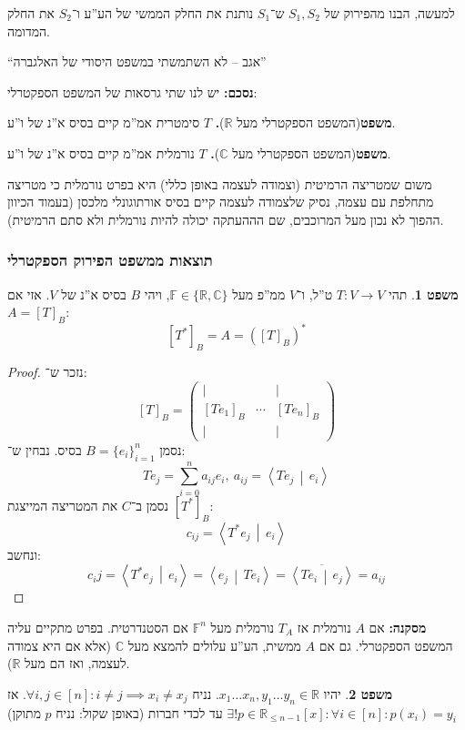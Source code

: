 \documentclass[a4paper]{article}
\newcommand\R     {\mathbb{R}}
\newcommand\C     {\mathbb{C}}
\newcommand\ra    {\rangle}
\newcommand\la    {\langle}
\newcommand\ol    {\overline}
\newcommand\sumni     {\sum_{i = 0}^{n}}
\newcommand\F         {\mathbb{F}}
\newcommand\co        {\colon}
\newcommand\pms[1]    {\begin{pmatrix}
		#1
\end{pmatrix}}
\newcommand\mut [2]   {\left \la #1 \,\middle|\, #2 \right \ra}
\theoremstyle{definition}
\newtheorem{Theorem}{\color{myblue}משפט}
\newcommand\theo  [1] {\begin{Theorem}#1\end{Theorem}}
\begin{document}
	למעשה, הבנו מהפירוק של $S_1, S_2$ ש־$S_1$ נותנת את החלק הממשי של הע''ע ו־$S_2$ את החלק המדומה. 
	
	``אגב – לא השתמשתי במשפט היסודי של האלגברה''
	
	\textbf{נסכם: }יש לנו שתי גרסאות של המשפט הספקטרלי: 
	
	\textbf{משפט}(המשפט הספקטרלי מעל $\R$)\textbf{. }{$T$ סימטרית אמ''מ קיים בסיס א''נ של ו''ע. }
	
	\textbf{משפט}{(המשפט הספקטרלי מעל $\C$)\textbf{. } $T$ נורמלית אמ''מ קיים בסיס א''נ של ו''ע. }
	
	משום שמטריצה הרמיטית (וצמודה לעצמה באופן כללי) היא בפרט נורמלית כי מטריצה מתחלפת עם עצמה, נסיק שלצמודה לעצמה קיים בסיס אורתוגונלי מלכסן (בעמוד הכיוון ההפוך לא נכון מעל המרוכבים, שם הההעתקה יכולה להיות נורמלית ולא סתם הרמיטית). 
	
	\subsubsection{תוצאות ממשפט הפירוק הספקטרלי}
	
	\theo{תהי $T \co V \to V$ ט''ל, ו־$V$ ממ''פ מעל $\F \in \{\R, \C\}$, ויהי $B$ בסיס א''נ של $V$. אזי אם $A = [T]_B$: 
		\[ [T^*]_B = A = ([T]_B)^* \]}  
	\begin{proof}
		נזכר ש־: 
		\[ [T]_B = \pms{\vert &  & \vert \\ [Te_1]_B & \cdots & [Te_n]_B \\ \vert &  & \vert} \]
		נסמן $B = \{e_i\}_{i = 1}^{n}$ בסיס. נבחין ש־: 
		\[ Te_j = \sumni a_{ij}e_i, \ a_{ij} = \mut{Te_j}{e_i} \]
		נסמן ב־$C$ את המטריצה המייצגת $[T^*]_B$: 
		\[ c_{ij} = \mut{T^*e_j}{e_i} \]
		ונחשב: 
		\[ c_ij = \mut{T^*e_j}{e_i} = \mut{e_j}{Te_i} = \ol{\mut{Te_i}{e_j}} = a_{ij} \]
		
	\end{proof}
	
	\textbf{מסקנה: }אם $A$ נורמלית אז $T_A$ נורמלית מעל $\F^n$ אם הסטנדרטית. בפרט מתקיים עליה המשפט הספקטרלי. גם אם $A$ ממשית, הע''ע עלולים להמצא מעל $\C$ (אלא אם היא צמודה לעצמה, ואז הם מעל $\R$). 
	
	\theo{יהיו $x_1 \dots x_n, y_1 \dots y_n \in \R$. נניח $\forall i, j \in [n] \co i \neq j \implies x_i \neq x_j$. אז $\exists! p \in \R_{\le n - 1}[x] \co \forall i \in [n] \co p(x_i) = y_i$ עד לכדי חברות (באופן שקול: נניח $p$ מתוקן) }
	
\end{document}
